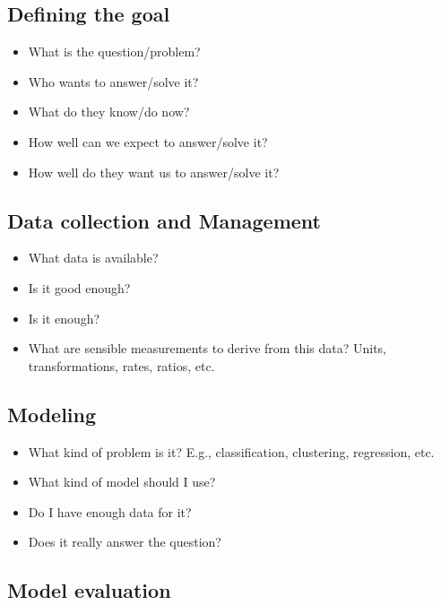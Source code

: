 \documentclass[12pt,]{book}
\providecommand{\tightlist}{%
  \setlength{\itemsep}{0pt}\setlength{\parskip}{0pt}}
\theoremstyle{definition}
\theoremstyle{definition}
\theoremstyle{definition}
\theoremstyle{remark}
\begin{document}
\subsection{Defining the goal}\label{defining-the-goal}

\begin{itemize}
\tightlist
\item
  What is the question/problem?
\item
  Who wants to answer/solve it?
\item
  What do they know/do now?
\item
  How well can we expect to answer/solve it?
\item
  How well do they want us to answer/solve it?
\end{itemize}

\subsection{Data collection and
Management}\label{data-collection-and-management}

\begin{itemize}
\tightlist
\item
  What data is available?
\item
  Is it good enough?
\item
  Is it enough?
\item
  What are sensible measurements to derive from this data? Units,
  transformations, rates, ratios, etc.
\end{itemize}

\subsection{Modeling}\label{modeling}

\begin{itemize}
\tightlist
\item
  What kind of problem is it? E.g., classification, clustering,
  regression, etc.
\item
  What kind of model should I use?
\item
  Do I have enough data for it?
\item
  Does it really answer the question?
\end{itemize}

\subsection{Model evaluation}\label{model-evaluation}
\end{document}
